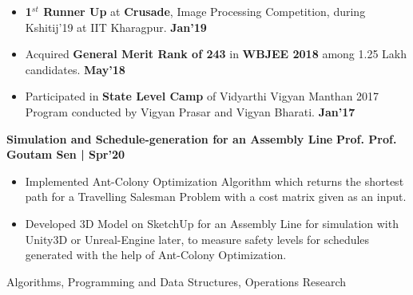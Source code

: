 \documentclass[10pt]{article}
\begin{document}
\begin{itemize}[leftmargin=*]
\item \textbf{1$^{st}$ Runner Up} at \textbf{Crusade}, Image Processing Competition, during Kshitij'19 at IIT Kharagpur.\href{https://github.com/Mintuagarwal/Credentials/blob/master/Crusade/RunnerUpCrusade.pdf} {\hspace{0.5ex}\footnotesize\faMousePointer} {\hfill}\textbf{Jan'19}\\[-1.8em]
\item Acquired \textbf{General Merit Rank of 243} in \textbf{WBJEE 2018} among 1.25 Lakh candidates.
\href{https://github.com/Mintuagarwal/Credentials/blob/master/Academics/WBJEEM\%20Rank\%20Card.pdf} {\hspace{0.5ex}\footnotesize\faMousePointer} 
{\hfill}\textbf{May'18}\\[-1.8em]
\item Participated in \textbf{State Level Camp} of Vidyarthi Vigyan Manthan 2017 Program conducted by Vigyan Prasar and Vigyan Bharati. {\hfill}\textbf{Jan'17}\\[-1.8em]
\end{itemize}

\spacedhrule{0.15ex}{1.0ex}
\large {\textbf{Simulation and Schedule-generation for an Assembly Line}} \normalsize  \iffalse \href{https://github.com/harsh639/GeneticAlgorithm} {\hspace{0.5ex}\faGithub}\fi {\hfill} \textbf{Prof. Prof. Goutam Sen | Spr'20}\\[-1.75em]
\begin{itemize}
\item Implemented Ant-Colony Optimization Algorithm which returns the shortest path for a Travelling Salesman Problem with a cost matrix given as an input.\\[-1.8em]
\item Developed 3D Model on SketchUp for an Assembly Line for simulation with Unity3D or Unreal-Engine later, to measure safety levels for schedules generated with the help of Ant-Colony Optimization.\\[-1.8em]
\end{itemize}
\vspace{-0.6ex}
\spacedhrule{0.15ex}{1.0ex}
\begin{indentsection}
	{Algorithms, Programming and Data Structures, Operations Research }\\[-1em]
\end{indentsection}
\end{document}

